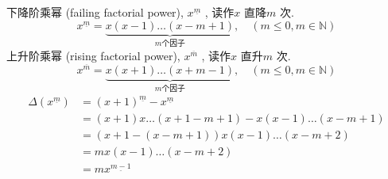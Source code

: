 \documentclass[mode=geye]{elegantnote}
\newcommand{\fallingfactorial}[1]{%
  ^{\underline{#1}}%
}
\newcommand{\risingfactorial}[1]{%
  ^{\overline{#1}}%
}
\begin{document}
下降阶乘幂 (failing factorial power), $ x\fallingfactorial{m} $ , 读作$ x $ 直降$ m $ 次.\\
\begin{equation*}
    x\fallingfactorial{m} = \underbrace{x(x-1)\dots(x-m+1)}_{\textit{m个因子}}, \quad (m\leqslant 0, m\in\mathbb{N}) 
\end{equation*}
上升阶乘幂 (rising factorial power), $ x\risingfactorial{m} $ , 读作$ x $ 直升$ m $ 次.\\
\begin{equation*}
    x\risingfactorial{m} = \underbrace{x(x+1)\dots(x+m-1)}_{\textit{m个因子}}, \quad (m\leqslant 0, m\in\mathbb{N}) 
\end{equation*}
\begin{align*}
    \Delta(x\fallingfactorial{m}) &= (x+1)\fallingfactorial{m}-x\fallingfactorial{m} \\
    &= (x+1)x\dots(x+1-m+1) - x(x-1)\dots(x-m+1) \\
    &= (x+1-(x-m+1))x(x-1)\dots(x-m+2) \\
    &= mx(x-1)\dots(x-m+2) \\
    &= mx\fallingfactorial{m-1}
\end{align*}
\end{document}
